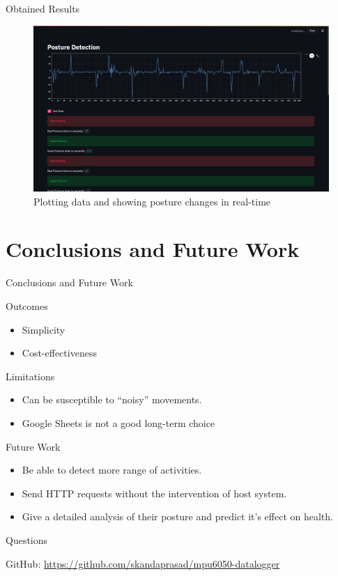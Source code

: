 \documentclass[aspectratio=169,xcolor=dvipsnames]{beamer}
\begin{document}
\begin{frame}{Obtained Results}
    \begin{figure}
        \centering
        \includegraphics[scale=0.18]{webappss2.png}
        \caption{Plotting data and showing posture changes in real-time}
        \label{fig:results}
    \end{figure}

\end{frame}

\section{Conclusions and Future Work}

\begin{frame}{Conclusions and Future Work}
    \begin{block}{Outcomes}
        \begin{itemize}
            \item Simplicity
            \item Cost-effectiveness
        \end{itemize}
    \end{block}
    \begin{block}{Limitations}
        \begin{itemize}
            \item Can be susceptible to ``noisy'' movements.
            \item Google Sheets is not a good long-term choice
        \end{itemize}
    \end{block}
    \begin{block}{Future Work}
        \begin{itemize}
            \item Be able to detect more range of activities.
            \item Send HTTP requests without the intervention of host system.
            \item Give a detailed analysis of their posture and predict it's
                effect on health.
        \end{itemize}

    \end{block}
\end{frame}

\begin{frame}
     \Huge{\centerline{Questions}}
     \vspace{1cm}
    {\large \centerline{GitHub: \url{https://github.com/skandaprasad/mpu6050-datalogger}}}
\end{frame}
\end{document}
